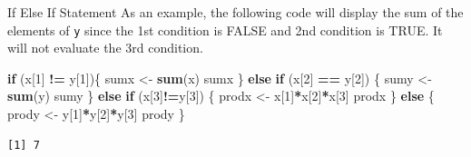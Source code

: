 \documentclass[
  ignorenonframetext,
]{beamer}
\newenvironment{Shaded}{\begin{snugshade}}{\end{snugshade}}
\newcommand{\ControlFlowTok}[1]{\textcolor[rgb]{0.13,0.29,0.53}{\textbf{#1}}}
\newcommand{\DecValTok}[1]{\textcolor[rgb]{0.00,0.00,0.81}{#1}}
\newcommand{\FunctionTok}[1]{\textcolor[rgb]{0.13,0.29,0.53}{\textbf{#1}}}
\newcommand{\NormalTok}[1]{#1}
\newcommand{\OtherTok}[1]{\textcolor[rgb]{0.56,0.35,0.01}{#1}}
\newcommand{\SpecialCharTok}[1]{\textcolor[rgb]{0.81,0.36,0.00}{\textbf{#1}}}
\begin{document}
\begin{frame}[fragile]{If Else If Statement}
\protect\hypertarget{if-else-if-statement-1}{}
As an example, the following code will display the sum of the elements
of \texttt{y} since the 1st condition is FALSE and 2nd condition is
TRUE. It will not evaluate the 3rd condition.

\small

\begin{Shaded}
\begin{Highlighting}[]
\ControlFlowTok{if}\NormalTok{ (x[}\DecValTok{1}\NormalTok{] }\SpecialCharTok{!=}\NormalTok{ y[}\DecValTok{1}\NormalTok{])\{}
\NormalTok{   sumx }\OtherTok{\textless{}{-}} \FunctionTok{sum}\NormalTok{(x)}
\NormalTok{   sumx}
\NormalTok{  \} }\ControlFlowTok{else} \ControlFlowTok{if}\NormalTok{ (x[}\DecValTok{2}\NormalTok{] }\SpecialCharTok{==}\NormalTok{ y[}\DecValTok{2}\NormalTok{]) \{}
\NormalTok{   sumy }\OtherTok{\textless{}{-}} \FunctionTok{sum}\NormalTok{(y)}
\NormalTok{   sumy}
\NormalTok{   \} }\ControlFlowTok{else} \ControlFlowTok{if}\NormalTok{ (x[}\DecValTok{3}\NormalTok{]}\SpecialCharTok{!=}\NormalTok{y[}\DecValTok{3}\NormalTok{]) \{}
\NormalTok{   prodx }\OtherTok{\textless{}{-}}\NormalTok{ x[}\DecValTok{1}\NormalTok{]}\SpecialCharTok{*}\NormalTok{x[}\DecValTok{2}\NormalTok{]}\SpecialCharTok{*}\NormalTok{x[}\DecValTok{3}\NormalTok{]}
\NormalTok{   prodx}
\NormalTok{   \} }\ControlFlowTok{else}\NormalTok{ \{}
\NormalTok{   prody }\OtherTok{\textless{}{-}}\NormalTok{ y[}\DecValTok{1}\NormalTok{]}\SpecialCharTok{*}\NormalTok{y[}\DecValTok{2}\NormalTok{]}\SpecialCharTok{*}\NormalTok{y[}\DecValTok{3}\NormalTok{]}
\NormalTok{   prody}
\NormalTok{\}}
\end{Highlighting}
\end{Shaded}

\begin{verbatim}
[1] 7
\end{verbatim}

\normalsize
\end{frame}
\end{document}
